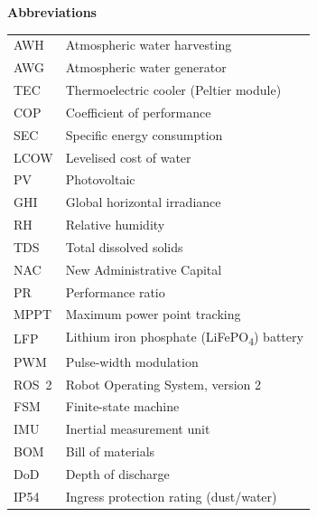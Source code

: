 \documentclass[12pt,a4paper]{report}   %
\begin{document}
\noindent\textbf{Abbreviations}\\[0.4em]
\noindent\begin{tabular}{p{2.6cm}p{12.0cm}}
AWH & Atmospheric water harvesting \\
AWG & Atmospheric water generator \\
TEC & Thermoelectric cooler (Peltier module) \\
COP & Coefficient of performance \\
SEC & Specific energy consumption \\
LCOW & Levelised cost of water \\
PV & Photovoltaic \\
GHI & Global horizontal irradiance \\
RH & Relative humidity \\
TDS & Total dissolved solids \\
NAC & New Administrative Capital \\
PR & Performance ratio \\
MPPT & Maximum power point tracking \\
LFP & Lithium iron phosphate (LiFePO\textsubscript{4}) battery \\
PWM & Pulse-width modulation \\
ROS~2 & Robot Operating System, version 2 \\
FSM & Finite-state machine \\
IMU & Inertial measurement unit \\
BOM & Bill of materials \\
DoD & Depth of discharge \\
IP54 & Ingress protection rating (dust/water) \\
\end{tabular}
\end{document}
